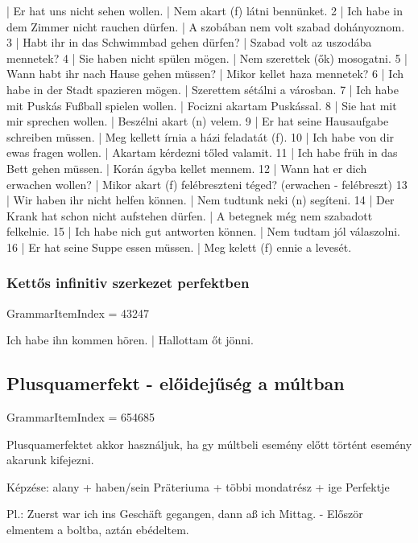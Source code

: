 \documentclass{article}
\newenvironment{desc}{\verbatim}{\endverbatim}
\newenvironment{exmp}{\verbatim}{\endverbatim}
\begin{document}
\begin{exmp}
1 | Er hat uns nicht sehen wollen. | Nem akart (f) látni bennünket.
2 | Ich habe in dem Zimmer nicht rauchen dürfen. | A szobában nem volt szabad dohányoznom.
3 | Habt ihr in das Schwimmbad gehen dürfen? | Szabad volt az uszodába mennetek?
4 | Sie haben nicht spülen mögen. | Nem szerettek (ők) mosogatni.
5 | Wann habt ihr nach Hause gehen müssen? | Mikor kellet haza mennetek?
6 | Ich habe in der Stadt spazieren mögen. | Szerettem sétálni a városban.
7 | Ich habe mit Puskás Fußball spielen wollen. | Focizni akartam Puskással.
8 | Sie hat mit mir sprechen wollen. | Beszélni akart (n) velem.
9 | Er hat seine Hausaufgabe schreiben müssen. | Meg kellett írnia a házi feladatát (f).
10 | Ich habe von dir ewas fragen wollen. | Akartam kérdezni tőled valamit.
11 | Ich habe früh in das Bett gehen müssen. | Korán ágyba kellet mennem.
12 | Wann hat er dich erwachen wollen? | Mikor akart (f) felébreszteni téged? (erwachen - felébreszt)
13 | Wir haben ihr nicht helfen können. | Nem tudtunk neki (n) segíteni.
14 | Der Krank hat schon nicht aufstehen dürfen. | A betegnek még nem szabadott felkelnie.
15 | Ich habe nich gut antworten können. | Nem tudtam jól válaszolni.
16 | Er hat seine Suppe essen müssen. | Meg kelett (f) ennie a levesét.
\end{exmp}

\subsubsection{Kettős infinitiv szerkezet perfektben}

GrammarItemIndex = 43247

\begin{desc}
Ich habe ihn kommen hören. | Hallottam őt jönni.
\end{desc}

\subsection{Plusquamerfekt - előidejűség a múltban}

GrammarItemIndex = 654685

\begin{desc}
Plusquamerfektet akkor használjuk, ha gy múltbeli esemény előtt történt esemény akarunk kifejezni.

Képzése:
alany + haben/sein Präteriuma + többi mondatrész + ige Perfektje

Pl.: Zuerst war ich ins Geschäft gegangen, dann aß ich Mittag. - Először elmentem a boltba, aztán ebédeltem.
\end{desc}
\end{document}
